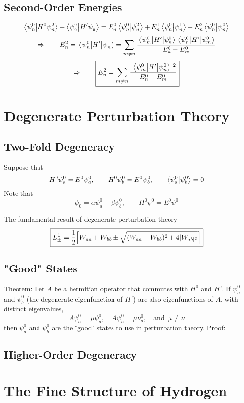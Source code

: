 \subsection{Second-Order Energies}
\[\braket{\psi_n^0}{H^0\psi_n^2} + \braket{\psi_n^0}{H'\psi_n^1}=
  E_n^0\braket{\psi_n^0}{\psi_n^2}+ E_n^1\braket{\psi_n^0}{\psi_n^1} + E_n^2\braket{\psi_n^0}{\psi_n^0}\]
\[\Rightarrow\qquad E_n^2=\matrixel{\psi_n^0}{H'}{\psi_n^1}=\sum_{m\neq n}\frac{\matrixel{\psi_m^0}{H'}{\psi_n^0}\matrixel{\psi_n^0}{H'}{\psi_m^0}}{E_n^0-E_m^0}\]
\[\Rightarrow\qquad\boxed{ E_n^2 = \sum_{m\neq n} \frac{|\matrixel{\psi_m^0}{H'}{\psi_n^0} |^2}{E_n^0 - E_m^0}}\]
\section{Degenerate Perturbation Theory}
\subsection{Two-Fold Degeneracy}
Suppose that 
\[H^0\psi_a^0=E^0\psi_a^0,\qquad H^0\psi_b^0=E^0\psi_b^0,\qquad \braket{\psi_a^0}{\psi_b^0}=0\]
Note that 
\[\psi_0=\alpha\psi_a^0+\beta\psi_b^0,\qquad H^0\psi^0=E^0\psi^0\]

The fundamental result of degenerate perturbation theory
\[\boxed{
    E_{\pm}^1=\frac{1}{2}\qty[W_{aa}+W_{bb}\pm\sqrt{(W_{aa}-W_{bb})^2+4|W_{ab|^2}}]
}\]
\subsection{"Good" States}
Theorem: Let \(A\) be a hermitian operator that commutes with \(H^0\) and \(H'\). If \(\psi_a^0\) and 
\(\psi_b^0\) (the degenerate eigenfunction of \(H^0\)) are also eigenfunctions of \(A\), with distinct eigenvalues,
\[A\psi_a^0=\mu\psi_a^0,\quad A\psi_a^0=\mu\nu_a^0, \quad\text{and }\,\mu\neq\nu\]
then \(\psi_a^0\) and \(\psi_b^0\) are the "good" states to use in perturbation theory.\newline
Proof:
\subsection{Higher-Order Degeneracy}
\section{The Fine Structure of Hydrogen}
